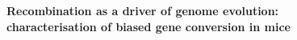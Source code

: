 \documentclass[a4paper,twoside]{ociamthesis}
\newcommand\otherpagedecoration{%
\begin{tikzpicture}[remember picture,overlay,shorten >= -10pt]

\coordinate (aux1) at ([yshift=-15pt]current page.north east);
\coordinate (aux2) at ([yshift=-410pt]current page.north east);
\coordinate (aux3) at ([xshift=-4.5cm]current page.north east);
\coordinate (aux4) at ([yshift=-150pt]current page.north east);

\begin{scope}[titlepagecolor!40,line width=12pt,rounded corners=12pt]
\draw
  (aux1) -- coordinate (a)
  ++(225:5) --
  ++(-45:5.1) coordinate (b);
\draw[shorten <= -10pt]
  (aux3) --
  (a) --
  (aux1);
\draw[opacity=0.6,titlepagecolor,shorten <= -10pt]
  (b) --
  ++(225:2.2) --
  ++(-45:2.2);
\end{scope}
\draw[titlepagecolor,line width=8pt,rounded corners=8pt,shorten <= -10pt]
  (aux4) --
  ++(225:0.8) --
  ++(-45:0.8);
\end{tikzpicture}%
}
\begin{document}
\begin{alwayssingle}
\begingroup
\begin{center}
	\fontsize{25pt}{28pt}\selectfont
	\textbf{Recombination as a driver of genome evolution:\\characterisation of biased gene conversion in mice}
\end{center}

\endgroup

\begingroup
\setlength{\parskip}{0.5em}
{

}
\endgroup
\end{alwayssingle}


\begin{romanpages}


	
\begin{acknowledgements}%
	 
\end{acknowledgements}



\dominitoc %

\flushbottom

\tableofcontents%

\listoffigures%
	\mtcaddchapter

\listoftables
	\mtcaddchapter






\end{romanpages}
\end{document}
